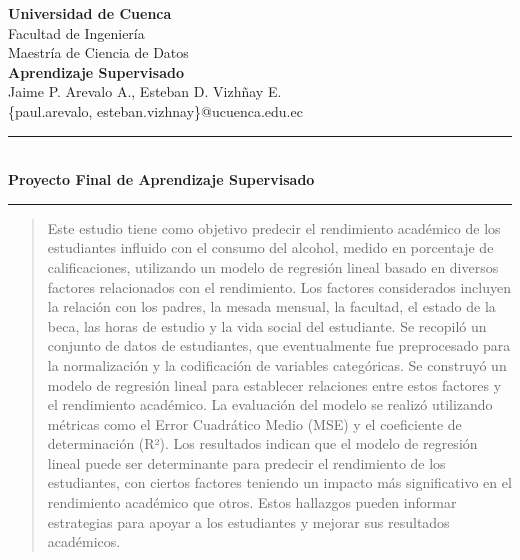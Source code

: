 \documentclass[a4paper,12pt]{article}
\begin{document}
\begin{center}
  \centering

  {\LARGE \textbf{Universidad de Cuenca}}\\[0.2cm] %

  {\large Facultad de Ingeniería}\\[0.2cm] %
  {\large Maestría de Ciencia de Datos}\\[0.5cm] %

  {\Large \textbf{Aprendizaje Supervisado}}\\[0.2cm] %
  {\large Jaime P. Arevalo A., Esteban D. Vizhñay E.}\\[0.2cm]
  {\large \{paul.arevalo, esteban.vizhnay\}@ucuenca.edu.ec}\\[0cm]

  \rule{\linewidth}{0.30mm}\\[0.25cm] %
  {\Large \textbf{Proyecto Final de Aprendizaje Supervisado}} %
  \rule{\linewidth}{0.30mm} %

\end{center}

\begin{abstract}
  Este estudio tiene como objetivo predecir el rendimiento académico de los estudiantes influido con el consumo del alcohol, medido en porcentaje de calificaciones, utilizando un modelo de regresión lineal basado en diversos factores relacionados con el rendimiento. Los factores considerados incluyen la relación con los padres, la mesada mensual, la facultad, el estado de la beca, las horas de estudio y la vida social del estudiante. Se recopiló un conjunto de datos de estudiantes, que eventualmente fue preprocesado para la normalización y la codificación de variables categóricas. Se construyó un modelo de regresión lineal para establecer relaciones entre estos factores y el rendimiento académico. La evaluación del modelo se realizó utilizando métricas como el Error Cuadrático Medio (MSE) y el coeficiente de determinación (R²). Los resultados indican que el modelo de regresión lineal puede ser determinante para predecir el rendimiento de los estudiantes, con ciertos factores teniendo un impacto más significativo en el rendimiento académico que otros. Estos hallazgos pueden informar estrategias para apoyar a los estudiantes y mejorar sus resultados académicos.
\end{abstract}
\end{document}
